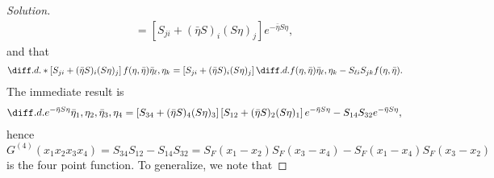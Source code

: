 \begin{proof}[Solution]
\begin{align*}
      &= \left[S_{ji} + (\bar{\eta} S)_i (S \eta)_j\right]e^{- \bar{\eta} S \eta},
   \end{align*}
   and that
   \begin{align*}
      \diff.d.*{\left[S_{ji} + (\bar{\eta} S)_i(S \eta)_j\right]f(\eta, \bar{\eta})}{\bar{\eta}_\ell,\eta_k}
      &= \left[S_{ji} + (\bar{\eta} S)_i (S \eta)_j\right] \diff.d.{f(\eta, \bar{\eta})}{\bar{\eta}_\ell,\eta_k} - S_{\ell i}S_{jk} f(\eta, \bar{\eta}).
   \end{align*}
   The immediate result is
   \begin{align*}
      \diff.d.{e^{- \bar{\eta} S \eta}}{\bar{\eta}_1,\eta_2,\bar{\eta}_3,\eta_4} 
      &= \left[S_{34}  + (\bar{\eta} S)_4 (S \eta)_3\right]\left[S_{12}  + (\bar{\eta} S)_2 (S \eta)_1\right]e^{- \bar{\eta} S \eta} - S_{14} S_{32} e^{- \bar{\eta} S \eta},
   \end{align*}
   hence
   \begin{equation*}
      G^{(4)}(x_1 x_2 x_3 x_4) = S_{34} S_{12} - S_{14} S_{32} = S_F(x_1 - x_2) S_F(x_3 - x_4) - S_F(x_1 - x_4) S_F(x_3 - x_2)
   \end{equation*}
   is the four point function. To generalize, we note that
\end{proof}

